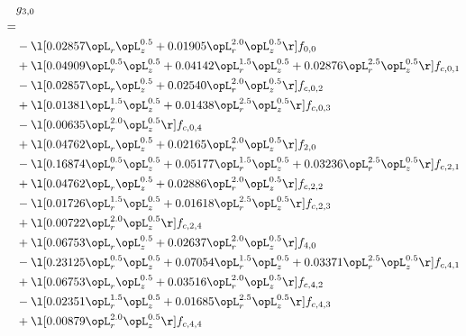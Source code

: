 \begin{alignat}{2} 
\label{eq:g_30_0} 
& g_{3,0} \nonumber \\ 
 = \\ 
& - \l[  0.02857 \opL_r \opL_z^{0.5} +  0.01905 \opL_r^{2.0} \opL_z^{0.5}  \r] f_{0,0} \nonumber \\ 
& + \l[  0.04909 \opL_r^{0.5} \opL_z^{0.5} +  0.04142 \opL_r^{1.5} \opL_z^{0.5} +  0.02876 \opL_r^{2.5} \opL_z^{0.5}  \r] f_{c,0,1} \nonumber \\ 
& - \l[  0.02857 \opL_r \opL_z^{0.5} +  0.02540 \opL_r^{2.0} \opL_z^{0.5}  \r] f_{c,0,2} \nonumber \\ 
& + \l[  0.01381 \opL_r^{1.5} \opL_z^{0.5} +  0.01438 \opL_r^{2.5} \opL_z^{0.5}  \r] f_{c,0,3} \nonumber \\ 
& - \l[  0.00635 \opL_r^{2.0} \opL_z^{0.5}  \r] f_{c,0,4} \nonumber \\ 
& + \l[  0.04762 \opL_r \opL_z^{0.5} +  0.02165 \opL_r^{2.0} \opL_z^{0.5}  \r] f_{2,0} \nonumber \\ 
& - \l[  0.16874 \opL_r^{0.5} \opL_z^{0.5} +  0.05177 \opL_r^{1.5} \opL_z^{0.5} +  0.03236 \opL_r^{2.5} \opL_z^{0.5}  \r] f_{c,2,1} \nonumber \\ 
& + \l[  0.04762 \opL_r \opL_z^{0.5} +  0.02886 \opL_r^{2.0} \opL_z^{0.5}  \r] f_{c,2,2} \nonumber \\ 
& - \l[  0.01726 \opL_r^{1.5} \opL_z^{0.5} +  0.01618 \opL_r^{2.5} \opL_z^{0.5}  \r] f_{c,2,3} \nonumber \\ 
& + \l[  0.00722 \opL_r^{2.0} \opL_z^{0.5}  \r] f_{c,2,4} \nonumber \\ 
& + \l[  0.06753 \opL_r \opL_z^{0.5} +  0.02637 \opL_r^{2.0} \opL_z^{0.5}  \r] f_{4,0} \nonumber \\ 
& - \l[  0.23125 \opL_r^{0.5} \opL_z^{0.5} +  0.07054 \opL_r^{1.5} \opL_z^{0.5} +  0.03371 \opL_r^{2.5} \opL_z^{0.5}  \r] f_{c,4,1} \nonumber \\ 
& + \l[  0.06753 \opL_r \opL_z^{0.5} +  0.03516 \opL_r^{2.0} \opL_z^{0.5}  \r] f_{c,4,2} \nonumber \\ 
& - \l[  0.02351 \opL_r^{1.5} \opL_z^{0.5} +  0.01685 \opL_r^{2.5} \opL_z^{0.5}  \r] f_{c,4,3} \nonumber \\ 
& + \l[  0.00879 \opL_r^{2.0} \opL_z^{0.5}  \r] f_{c,4,4} \nonumber \\ 
\end{alignat} 


